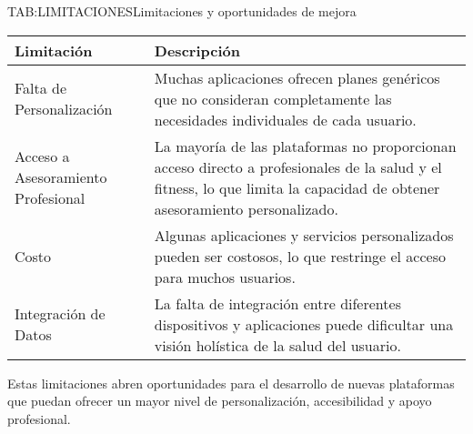\begin{table}[Limitaciones y Oportunidades de Mejora]{TAB:LIMITACIONES}{Limitaciones y oportunidades de mejora}
  \begin{tabular}{|p{5cm}|p{8cm}|}
    \hline
    \textbf{Limitación} & \textbf{Descripción} \\
    \hline
    Falta de Personalización & Muchas aplicaciones ofrecen planes genéricos que no consideran completamente las necesidades individuales de cada usuario. \\
    \hline
    Acceso a Asesoramiento Profesional & La mayoría de las plataformas no proporcionan acceso directo a profesionales de la salud y el fitness, lo que limita la capacidad de obtener asesoramiento personalizado. \\
    \hline
    Costo & Algunas aplicaciones y servicios personalizados pueden ser costosos, lo que restringe el acceso para muchos usuarios. \\
    \hline
    Integración de Datos & La falta de integración entre diferentes dispositivos y aplicaciones puede dificultar una visión holística de la salud del usuario. \\
    \hline
  \end{tabular}
\end{table}

Estas limitaciones abren oportunidades para el desarrollo de nuevas plataformas que puedan ofrecer un mayor nivel de personalización, accesibilidad y apoyo profesional.
